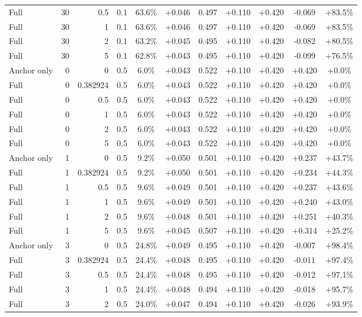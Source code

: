 \begin{table}[htbp]
\begin{tabular}{lrrrccccccc}
Full & 30 & 0.5 & 0.1 & 63.6\% & +0.046 & 0.497 & +0.110 & +0.420 & -0.069 & +83.5\% \\
Full & 30 & 1 & 0.1 & 63.6\% & +0.046 & 0.497 & +0.110 & +0.420 & -0.069 & +83.5\% \\
Full & 30 & 2 & 0.1 & 63.2\% & +0.045 & 0.495 & +0.110 & +0.420 & -0.082 & +80.5\% \\
Full & 30 & 5 & 0.1 & 62.8\% & +0.043 & 0.495 & +0.110 & +0.420 & -0.099 & +76.5\% \\
Anchor only & 0 & 0 & 0.5 & 6.0\% & +0.043 & 0.522 & +0.110 & +0.420 & +0.420 & +0.0\% \\
Full & 0 & 0.382924 & 0.5 & 6.0\% & +0.043 & 0.522 & +0.110 & +0.420 & +0.420 & +0.0\% \\
Full & 0 & 0.5 & 0.5 & 6.0\% & +0.043 & 0.522 & +0.110 & +0.420 & +0.420 & +0.0\% \\
Full & 0 & 1 & 0.5 & 6.0\% & +0.043 & 0.522 & +0.110 & +0.420 & +0.420 & +0.0\% \\
Full & 0 & 2 & 0.5 & 6.0\% & +0.043 & 0.522 & +0.110 & +0.420 & +0.420 & +0.0\% \\
Full & 0 & 5 & 0.5 & 6.0\% & +0.043 & 0.522 & +0.110 & +0.420 & +0.420 & +0.0\% \\
Anchor only & 1 & 0 & 0.5 & 9.2\% & +0.050 & 0.501 & +0.110 & +0.420 & +0.237 & +43.7\% \\
Full & 1 & 0.382924 & 0.5 & 9.2\% & +0.050 & 0.501 & +0.110 & +0.420 & +0.234 & +44.3\% \\
Full & 1 & 0.5 & 0.5 & 9.6\% & +0.049 & 0.501 & +0.110 & +0.420 & +0.237 & +43.6\% \\
Full & 1 & 1 & 0.5 & 9.6\% & +0.049 & 0.501 & +0.110 & +0.420 & +0.240 & +43.0\% \\
Full & 1 & 2 & 0.5 & 9.6\% & +0.048 & 0.501 & +0.110 & +0.420 & +0.251 & +40.3\% \\
Full & 1 & 5 & 0.5 & 9.6\% & +0.045 & 0.507 & +0.110 & +0.420 & +0.314 & +25.2\% \\
Anchor only & 3 & 0 & 0.5 & 24.8\% & +0.049 & 0.495 & +0.110 & +0.420 & -0.007 & +98.4\% \\
Full & 3 & 0.382924 & 0.5 & 24.4\% & +0.048 & 0.495 & +0.110 & +0.420 & -0.011 & +97.4\% \\
Full & 3 & 0.5 & 0.5 & 24.4\% & +0.048 & 0.495 & +0.110 & +0.420 & -0.012 & +97.1\% \\
Full & 3 & 1 & 0.5 & 24.4\% & +0.048 & 0.494 & +0.110 & +0.420 & -0.018 & +95.7\% \\
Full & 3 & 2 & 0.5 & 24.0\% & +0.047 & 0.494 & +0.110 & +0.420 & -0.026 & +93.9\% \\

\end{tabular}
\end{table}
